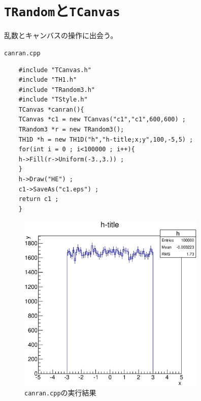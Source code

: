   \clearpage
 \section{\texttt{TRandom}と\texttt{TCanvas}}

 乱数とキャンバスの操作に出会う。

 \begin{itembox}{\texttt{canran.cpp}}
\begin{verbatim}
	#include "TCanvas.h"
	#include "TH1.h"
	#include "TRandom3.h"
	#include "TStyle.h"
	TCanvas *canran(){
	TCanvas *c1 = new TCanvas("c1","c1",600,600) ;
	TRandom3 *r = new TRandom3();
	TH1D *h = new TH1D("h","h-title;x;y",100,-5,5) ;
	for(int i = 0 ; i<100000 ; i++){
	h->Fill(r->Uniform(-3.,3.)) ;
	}
	h->Draw("HE") ;
	c1->SaveAs("c1.eps") ;
	return c1 ;
	}
\end{verbatim}
 \end{itembox}


 \begin{figure}[htbp]
  \begin{center}
   \includegraphics[width = 90mm] {./picture/canrancanvas1.eps}
  \end{center}
  \caption{\texttt{canran.cpp}の実行結果}
  \label{Fig:canrancanvas1}
 \end{figure}


